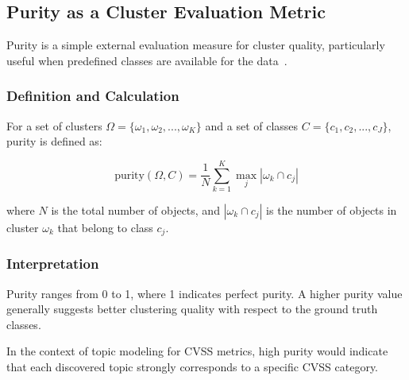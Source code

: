 \documentclass[12pt]{article}
\begin{document}
\subsection{Purity as a Cluster Evaluation Metric}\label{sec:purity}

Purity is a simple external evaluation measure for cluster quality, particularly useful when
predefined classes are available for the data~\cite{purity_usuage}.

\subsubsection*{Definition and Calculation}

For a set of clusters $\Omega = \{\omega_1, \omega_2, ..., \omega_K\}$ and a set of classes $C =
	\{c_1, c_2, ..., c_J\}$, purity is defined as:

\begin{equation}
	\text{purity}(\Omega, C) = \frac{1}{N} \sum_{k=1}^K \max_j |\omega_k \cap c_j|
\end{equation}

where $N$ is the total number of objects, and $|\omega_k \cap c_j|$ is the number of objects in
cluster $\omega_k$ that belong to class $c_j$.

\subsubsection*{Interpretation}

Purity ranges from 0 to 1, where 1 indicates perfect purity. A higher purity value generally
suggests better clustering quality with respect to the ground truth classes\cite{purity_info_ret}.

In the context of topic modeling for CVSS metrics, high purity would indicate that each discovered
topic strongly corresponds to a specific CVSS category.
\end{document}
